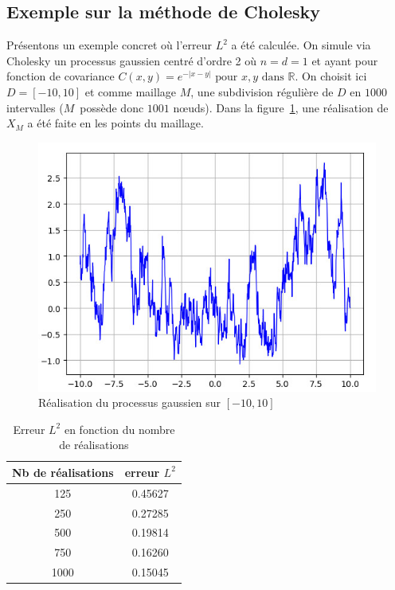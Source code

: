 \subsection{Exemple sur la méthode de Cholesky}
Présentons un exemple concret où l'erreur $L^2$ a été calculée. On simule via Cholesky un processus
gaussien centré d'ordre 2 où $n = d = 1$ et ayant pour fonction de covariance $C(x,y) = e^{-|x-y|} \text{ pour } x,y \text{ dans } \mathbb{R} $.
On choisit ici $D=[-10,10]$ et comme maillage $M$, une subdivision régulière de $D$ en $1000$ intervalles ($M$~possède donc $1001$ n\oe uds).
Dans la figure~\ref{figCholeskyRea},  une réalisation de $X_M$ a été faite en les points du maillage. 

\begin{figure}[h]
\begin{center}
\includegraphics[scale=0.6]{images/ReaCholesky1D-1001nodes.jpg}
\caption{Réalisation du processus gaussien sur $[-10,10]$}
\label{figCholeskyRea}  
\end{center}
\end{figure}

\begin{table}[h]
\centering
\begin{tabular}{|c | c|}
\hline
Nb de réalisations & erreur $L^2$ \\
\hline
125 & 0.45627   \\
\hline
250  & 0.27285   \\
\hline
500  & 0.19814  \\
\hline
750  &  0.16260 \\
\hline
1000 &  0.15045 \\ 
\hline
\end{tabular}
\caption{Erreur $L^2$ en fonction du nombre de réalisations}
\end{table}


